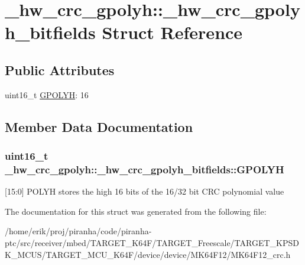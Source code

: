 \hypertarget{struct__hw__crc__gpolyh_1_1__hw__crc__gpolyh__bitfields}{}\section{\+\_\+hw\+\_\+crc\+\_\+gpolyh\+:\+:\+\_\+hw\+\_\+crc\+\_\+gpolyh\+\_\+bitfields Struct Reference}
\label{struct__hw__crc__gpolyh_1_1__hw__crc__gpolyh__bitfields}
\subsection*{Public Attributes}
\begin{DoxyCompactItemize}
\item 
uint16\+\_\+t \hyperlink{struct__hw__crc__gpolyh_1_1__hw__crc__gpolyh__bitfields_a7422ad868bb2c6e258c19fdf5d8e542b}{G\+P\+O\+L\+YH}\+: 16
\end{DoxyCompactItemize}


\subsection{Member Data Documentation}
\subsubsection[{\texorpdfstring{G\+P\+O\+L\+YH}{GPOLYH}}]{\setlength{\rightskip}{0pt plus 5cm}uint16\+\_\+t \+\_\+hw\+\_\+crc\+\_\+gpolyh\+::\+\_\+hw\+\_\+crc\+\_\+gpolyh\+\_\+bitfields\+::\+G\+P\+O\+L\+YH}\hypertarget{struct__hw__crc__gpolyh_1_1__hw__crc__gpolyh__bitfields_a7422ad868bb2c6e258c19fdf5d8e542b}{}\label{struct__hw__crc__gpolyh_1_1__hw__crc__gpolyh__bitfields_a7422ad868bb2c6e258c19fdf5d8e542b}
\mbox{[}15\+:0\mbox{]} P\+O\+L\+YH stores the high 16 bits of the 16/32 bit C\+RC polynomial value 

The documentation for this struct was generated from the following file\+:\begin{DoxyCompactItemize}
\item 
/home/erik/proj/piranha/code/piranha-\/ptc/src/receiver/mbed/\+T\+A\+R\+G\+E\+T\+\_\+\+K64\+F/\+T\+A\+R\+G\+E\+T\+\_\+\+Freescale/\+T\+A\+R\+G\+E\+T\+\_\+\+K\+P\+S\+D\+K\+\_\+\+M\+C\+U\+S/\+T\+A\+R\+G\+E\+T\+\_\+\+M\+C\+U\+\_\+\+K64\+F/device/device/\+M\+K64\+F12/M\+K64\+F12\+\_\+crc.\+h\end{DoxyCompactItemize}
